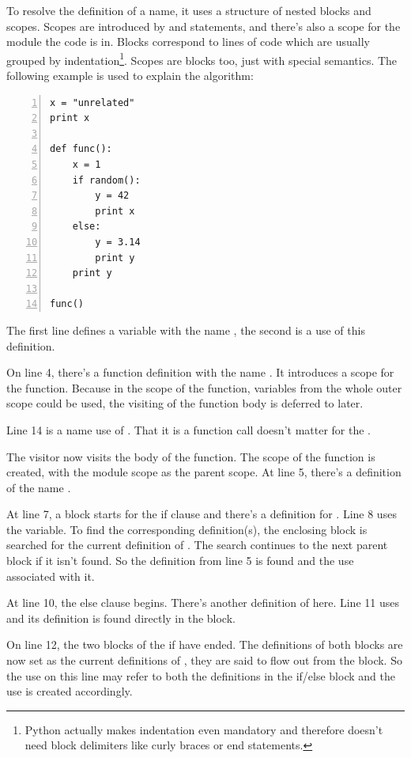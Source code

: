 \documentclass[12pt,halfparskip,DIV11,BCOR10mm]{scrreprt}
\begin{document}
To resolve the definition of a name, it uses a structure of nested blocks and scopes. Scopes are introduced by  and  statements, and there's also a scope for the module the code is in. Blocks correspond to lines of code which are usually grouped by indentation\footnote{Python actually makes indentation even mandatory and therefore doesn't need block delimiters like curly braces or end statements.}. Scopes are blocks too, just with special semantics. The following example is used to explain the algorithm:

\begin{lstlisting}[numbers=left]
x = "unrelated"
print x

def func():
    x = 1
    if random():
        y = 42
        print x
    else:
        y = 3.14
        print y
    print y

func()
\end{lstlisting}

The first line defines a variable with the name , the second is a use of this definition.

On line 4, there's a function definition with the name . It introduces a scope for the function. Because in the scope of the function, variables from the whole outer scope could be used, the visiting of the function body is deferred to later.

Line 14 is a name use of . That it is a function call doesn't matter for the .

The visitor now visits the body of the function. The scope of the function is created, with the module scope as the parent scope. At line 5, there's a definition of the name .

At line 7, a block starts for the if clause and there's a definition for . Line 8 uses the  variable. To find the corresponding definition(s), the enclosing block is searched for the current definition of . The search continues to the next parent block if it isn't found. So the definition from line 5 is found and the use associated with it.

At line 10, the else clause begins. There's another definition of  here. Line 11 uses  and its definition is found directly in the block.

On line 12, the two blocks of the if have ended. The definitions of both blocks are now set as the current definitions of , they are said to flow out from the block. So the use on this line may refer to both the definitions in the if/else block and the use is created accordingly.
\end{document}
